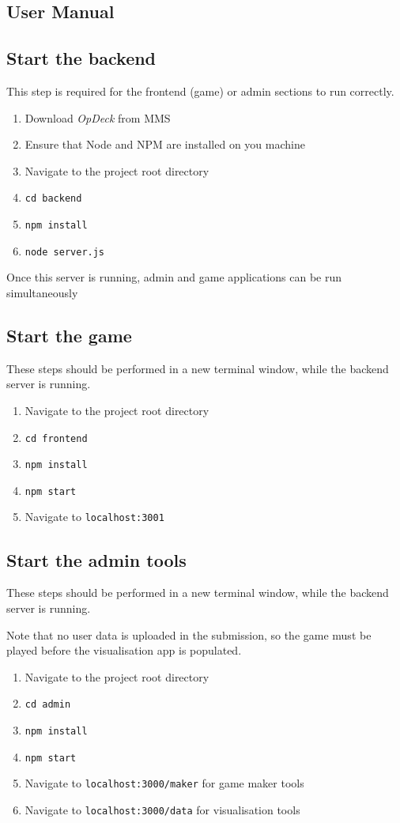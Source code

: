 \documentclass[]{report}
\newcommand{\od}{\textit{OpDeck}}
\def\c#1{\texttt{#1}}
\begin{document}
\begin{appendices}
  \section{User Manual}
  \subsection{Start the backend}
  This step is required for the frontend (game) or admin sections to run correctly.
  \begin{enumerate}
    \item Download \od{} from MMS
    \item Ensure that Node and NPM are installed on you machine
    \item Navigate to the project root directory
    \item \c{cd backend}
    \item \c{npm install}
    \item \c{node server.js}
  \end{enumerate}

  Once this server is running, admin and game applications can be run simultaneously

  \subsection{Start the game}
  These steps should be performed in a new terminal window, while the backend server is running.
  \begin{enumerate}
    \item Navigate to the project root directory
    \item \c{cd frontend}
    \item \c{npm install}
    \item \c{npm start}
    \item Navigate to \c{localhost:3001}
  \end{enumerate}

  \subsection{Start the admin tools}
  These steps should be performed in a new terminal window, while the backend server is running.

  Note that no user data is uploaded in the submission, so the game must be played before the visualisation app is populated.
  \begin{enumerate}
    \item Navigate to the project root directory
    \item \c{cd admin}
    \item \c{npm install}
    \item \c{npm start}
    \item Navigate to \c{localhost:3000/maker} for game maker tools
    \item Navigate to \c{localhost:3000/data} for visualisation tools
  \end{enumerate}


\end{appendices}
\end{document}

